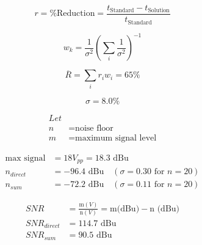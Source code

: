 \documentclass[12pt]{article}
\begin{document}
\huge

	$$ r = \text{\% Reduction} = \frac{t_\text{Standard} - t_\text{Solution}}{t_\text{Standard}} $$

	$$ w_k = \frac{1}{\sigma^2} \left( \sum_i \frac{1}{\sigma^2} \right) ^{-1} $$

	$$ \overline{R} = \sum_i r_i w_i = 65\%$$

	$$ \sigma = 8.0\% $$

	\begin{align*}
	Let\\
	n &= \text{noise floor} \\
	m &= \text{maximum signal level}
	\end{align*}

	\begin{align*}
	\text{max signal} &= 18 V_{pp} = 18.3 \text{ dBu} \\
	n_{direct} &= - 96.4 \text{ dBu} \quad (\sigma = 0.30 \text{ for } n = 20) \\
	n_{sum} &= -72.2 \text{ dBu} \quad (\sigma = 0.11 \text{ for } n = 20)
	\end{align*}

	\begin{align*}
	SNR &= \frac{\text{m}(V)}{\text{n} (V)} = \text{m(dBu)} - \text{n (dBu)} \\
	SNR_{direct} &= 114.7 \text{ dBu} \\
	SNR_{sum} &= 90.5 \text{ dBu} 
	\end{align*}

	
\end{document}
